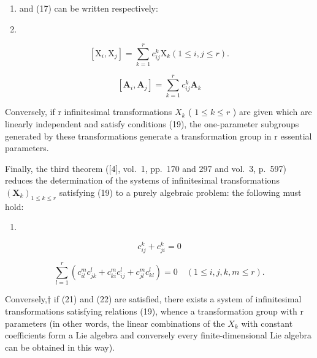 \begin{enumerate}
\def\labelenumi{(\arabic{enumi})}
\setcounter{enumi}{15}
\item
  and (17) can be written respectively:
\item
\end{enumerate}

\[
[ \mathrm{X} _ {i}, \mathrm{X} _ {j} ] = \sum_ {k = 1} ^ {r} c _ {i j} ^ {k} \mathrm{X} _ {k} (1 \leqslant i, j \leqslant r).\tag{20}
\]

\[
[ \mathbf {A} _ {i}, \mathbf {A} _ {j} ] = \sum_ {k = 1} ^ {r} c _ {i j} ^ {k} \mathbf {A} _ {k}
\]

Conversely, if r infinitesimal transformations \(X_{k}\) ( \(1 \leqslant k \leqslant r\) ) are given which are linearly independent and satisfy conditions (19), the one-parameter subgroups generated by these transformations generate a transformation group in r essential parameters.

Finally, the third theorem ({[}4{]}, vol.~1, pp.~170 and 297 and vol.~3, p.~597) reduces the determination of the systems of infinitesimal transformations \((\mathbf{X}_k)_{1 \leqslant k \leqslant r}\) satisfying (19) to a purely algebraic problem: the following must hold:

\begin{enumerate}
\def\labelenumi{(\arabic{enumi})}
\setcounter{enumi}{20}
\tightlist
\item
\end{enumerate}

\[
c _ {i j} ^ {k} + c _ {j i} ^ {k} = 0\tag{22}
\]

\[
\sum_ {l = 1} ^ {r} \left(c _ {i l} ^ {m} c _ {j k} ^ {l} + c _ {k i} ^ {m} c _ {i j} ^ {l} + c _ {j l} ^ {m} c _ {k l} ^ {l}\right) = 0 \quad (1 \leqslant i, j, k, m \leqslant r).
\]

Conversely,† if (21) and (22) are satisfied, there exists a system of infinitesimal transformations satisfying relations (19), whence a transformation group with r parameters (in other words, the linear combinations of the \(X_{k}\) with constant coefficients form a Lie algebra and conversely every finite-dimensional Lie algebra can be obtained in this way).

